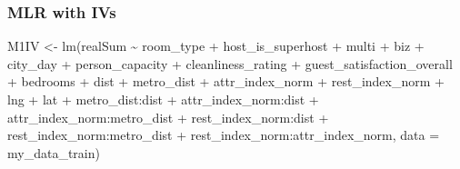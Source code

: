 \documentclass[
]{article}
\newenvironment{Shaded}{\begin{snugshade}}{\end{snugshade}}
\newcommand{\AttributeTok}[1]{\textcolor[rgb]{0.77,0.63,0.00}{#1}}
\newcommand{\FunctionTok}[1]{\textcolor[rgb]{0.00,0.00,0.00}{#1}}
\newcommand{\NormalTok}[1]{#1}
\newcommand{\OtherTok}[1]{\textcolor[rgb]{0.56,0.35,0.01}{#1}}
\newcommand{\SpecialCharTok}[1]{\textcolor[rgb]{0.00,0.00,0.00}{#1}}
\begin{document}
\hypertarget{mlr-with-ivs}{%
\subsubsection{MLR with IVs}\label{mlr-with-ivs}}

\begin{Shaded}
\begin{Highlighting}[]
\NormalTok{M1IV }\OtherTok{\textless{}{-}} \FunctionTok{lm}\NormalTok{(realSum }\SpecialCharTok{\textasciitilde{}}\NormalTok{ room\_type }\SpecialCharTok{+}\NormalTok{ host\_is\_superhost }\SpecialCharTok{+}\NormalTok{ multi }\SpecialCharTok{+}
\NormalTok{    biz }\SpecialCharTok{+}\NormalTok{ city\_day }\SpecialCharTok{+}\NormalTok{ person\_capacity }\SpecialCharTok{+}\NormalTok{ cleanliness\_rating }\SpecialCharTok{+}\NormalTok{ guest\_satisfaction\_overall }\SpecialCharTok{+}
\NormalTok{    bedrooms }\SpecialCharTok{+}\NormalTok{ dist }\SpecialCharTok{+}\NormalTok{ metro\_dist }\SpecialCharTok{+}\NormalTok{ attr\_index\_norm }\SpecialCharTok{+}\NormalTok{ rest\_index\_norm }\SpecialCharTok{+}
\NormalTok{    lng }\SpecialCharTok{+}\NormalTok{ lat }\SpecialCharTok{+}\NormalTok{ metro\_dist}\SpecialCharTok{:}\NormalTok{dist }\SpecialCharTok{+}\NormalTok{ attr\_index\_norm}\SpecialCharTok{:}\NormalTok{dist }\SpecialCharTok{+}\NormalTok{ attr\_index\_norm}\SpecialCharTok{:}\NormalTok{metro\_dist }\SpecialCharTok{+}
\NormalTok{    rest\_index\_norm}\SpecialCharTok{:}\NormalTok{dist }\SpecialCharTok{+}\NormalTok{ rest\_index\_norm}\SpecialCharTok{:}\NormalTok{metro\_dist }\SpecialCharTok{+}\NormalTok{ rest\_index\_norm}\SpecialCharTok{:}\NormalTok{attr\_index\_norm,}
    \AttributeTok{data =}\NormalTok{ my\_data\_train)}
\end{Highlighting}
\end{Shaded}
\end{document}
